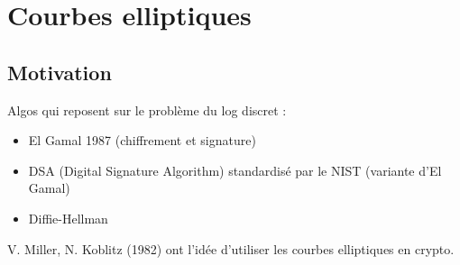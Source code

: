 \chapter{Courbes elliptiques}
    \section{Motivation}
        Algos qui reposent sur le problème du log discret :
        \begin{itemize}
            \item El Gamal 1987 (chiffrement et signature)
            \item DSA (Digital Signature Algorithm) standardisé par le NIST (variante d'El Gamal)
            \item Diffie-Hellman
        \end{itemize}
        V. Miller, N. Koblitz (1982) ont l'idée d'utiliser les courbes elliptiques en crypto.


